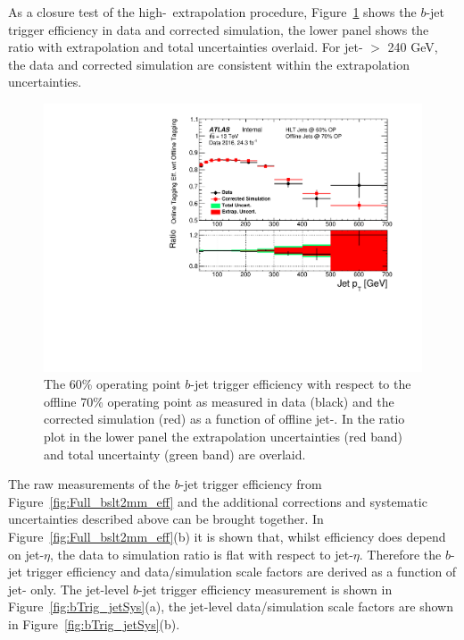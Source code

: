 As a closure test of the high-\pT~extrapolation procedure,
Figure~\ref{fig:bTrig_jetSys_effComp} shows the $b$-jet trigger efficiency in data and corrected simulation,
the lower panel shows the ratio with extrapolation and total uncertainties overlaid.
For jet-\pT{} $>$ 240 GeV, the data and corrected simulation are consistent within the extrapolation uncertainties.

\begin{figure}[!ht]
\begin{center}
    \includegraphics[width=0.5\linewidth, angle=0]{figs/Trigger/fullSys_EfficiencyComp_jetPt.pdf}
  \end{center}
\vspace{-1em}
\caption[The $b$-jet trigger efficiency measured in data and the corrected simulation as a function of offline jet-\pT.
  The extrapolation uncertainties and total uncertainty are shown.
    \label{fig:bTrig_jetSys_effComp}]
        {
    The 60\% operating point $b$-jet trigger efficiency with respect to the offline 70\% operating point
    as measured in data (black) and the corrected simulation (red) as a function of offline jet-\pT.
    In the ratio plot in the lower panel the extrapolation uncertainties (red band) and total uncertainty (green band) are overlaid.
    \label{fig:bTrig_jetSys_effComp}
  }
\end{figure}

\newpage

The raw measurements of the $b$-jet trigger efficiency from Figure~\ref{fig:Full_bslt2mm_eff}
and the additional corrections and systematic uncertainties described above can be brought together.
In Figure~\ref{fig:Full_bslt2mm_eff}(b) it is shown that, whilst efficiency does depend on jet-$\eta$,
the data to simulation ratio is flat with respect to jet-$\eta$.
Therefore the $b$-jet trigger efficiency and data/simulation scale factors are derived as a function of jet-\pT{} only. 
The jet-level $b$-jet trigger efficiency measurement is shown in Figure~\ref{fig:bTrig_jetSys}(a),
the jet-level data/simulation scale factors are shown in Figure~\ref{fig:bTrig_jetSys}(b).


